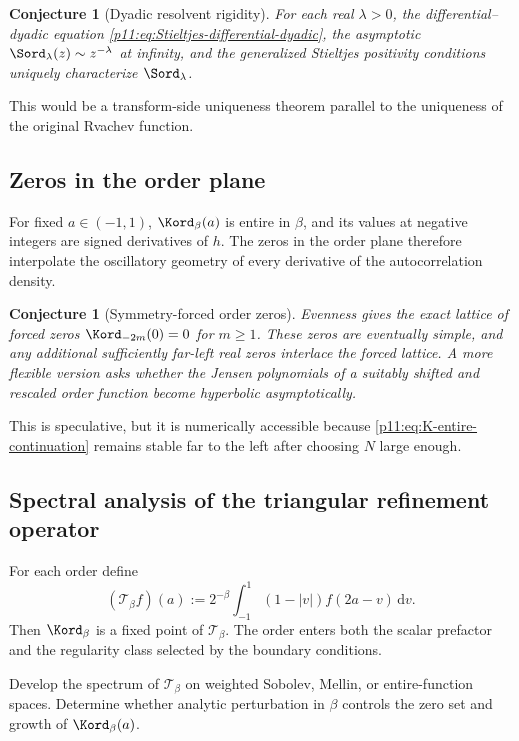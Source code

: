 \documentclass[11pt,oneside]{article}
\newtheorem{conjecture}[theorem]{Conjecture}
\theoremstyle{definition}
\theoremstyle{remark}
\newcommand{\dd}{\,\mathrm d}
\newcommand{\1}{\mathbf 1}
\begin{document}
\begin{conjecture}[Dyadic resolvent rigidity]
For each real $\lambda>0$, the differential--dyadic equation
\eqref{p11:eq:Stieltjes-differential-dyadic}, the asymptotic
$\Sord_\lambda(z)\sim z^{-\lambda}$ at infinity, and the generalized
Stieltjes positivity conditions uniquely characterize $\Sord_\lambda$.
\end{conjecture}

This would be a transform-side uniqueness theorem parallel to the uniqueness
of the original Rvachev function.

\subsection{Zeros in the order plane}

For fixed $a\in(-1,1)$, $\Kord_\beta(a)$ is entire in $\beta$, and its values
at negative integers are signed derivatives of $h$.  The zeros in the order
plane therefore interpolate the oscillatory geometry of every derivative of
the autocorrelation density.

\begin{conjecture}[Symmetry-forced order zeros]
Evenness gives the exact lattice of forced zeros
$\Kord_{-2m}(0)=0$ for $m\ge1$.  These zeros are eventually simple, and any
additional sufficiently far-left real zeros interlace the forced lattice.
A more flexible version asks whether the Jensen polynomials of a suitably
shifted and rescaled order function become hyperbolic asymptotically.
\end{conjecture}

This is speculative, but it is numerically accessible because
\eqref{p11:eq:K-entire-continuation} remains stable far to the left after choosing
$N$ large enough.

\subsection{Spectral analysis of the triangular refinement operator}

For each order define
\begin{equation}
 (\mathcal T_\beta f)(a)
 :=2^{-\beta}\int_{-1}^{1}(1-|v|)f(2a-v)\dd v.
\end{equation}
Then $\Kord_\beta$ is a fixed point of $\mathcal T_\beta$.  The order enters
both the scalar prefactor and the regularity class selected by the boundary
conditions.

\begin{problem}
Develop the spectrum of $\mathcal T_\beta$ on weighted Sobolev, Mellin, or
entire-function spaces.  Determine whether analytic perturbation in $\beta$
controls the zero set and growth of $\Kord_\beta(a)$.
\end{problem}
\end{document}
